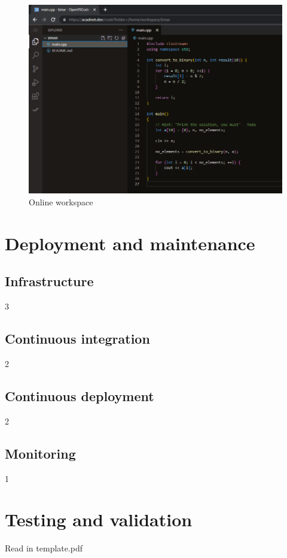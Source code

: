 \documentclass[12pt,a4paper]{report}
\begin{document}
\begin{figure}[h]
	\centering
	\includegraphics[width=\linewidth]{./pics/online-workspace.png}
	\caption{Online workspace}
	\label{fig:online-workspace}
\end{figure}


\chapter{Deployment and maintenance}
\section{Infrastructure}
3

\section{Continuous integration}
2

\section{Continuous deployment}
2

\section{Monitoring}
1



\chapter{Testing and validation}
Read in template.pdf
\end{document}

